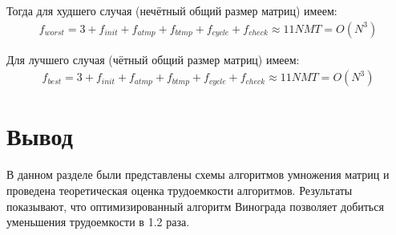 Тогда для худшего случая (нечётный общий размер матриц) имеем:
\begin{equation}
	\label{сomplexity:vinograd_opt_worst}
	\begin{aligned}
		f_{worst} = 3 + f_{init} + f_{atmp} + f_{btmp} + f_{cycle} + f_{check} \approx 11NMT = O(N^3)
	\end{aligned}
\end{equation}

Для лучшего случая (чётный общий размер матриц) имеем:
\begin{equation}
	\label{сomplexity:vinograd_opt_best}
	\begin{aligned}
		f_{best} = 3 + f_{init} + f_{atmp} + f_{btmp} + f_{cycle} + f_{check} \approx 11NMT = O(N^3)
	\end{aligned}
\end{equation}

\section*{Вывод}
В данном разделе были представлены схемы алгоритмов умножения матриц и проведена теоретическая оценка трудоемкости алгоритмов. 
Результаты показывают, что оптимизированный алгоритм Винограда позволяет добиться уменьшения трудоемкости в 1.2 раза.